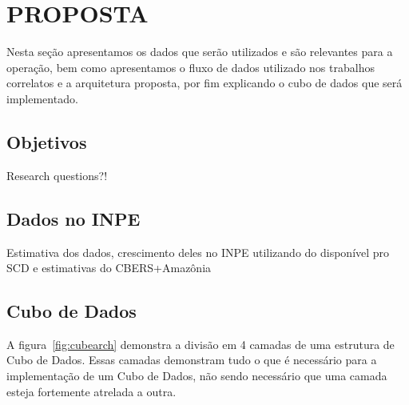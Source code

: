 
\chapter{PROPOSTA}\label{ch:prop}

{\color{red}
Nesta seção apresentamos os dados que serão utilizados e são relevantes para a operação, bem como apresentamos o fluxo de dados utilizado nos trabalhos correlatos e a arquitetura proposta, por fim explicando o cubo de dados que será implementado.
}

\section{Objetivos}\label{ch:prop:obj}

{\color{red} Research questions?!}

\section{Dados no INPE}\label{ch:prop:data}

{\color{red} Estimativa dos dados, crescimento deles no INPE utilizando do disponível pro SCD e estimativas do CBERS+Amazônia}

\section{Cubo de Dados}\label{ch:prop:cubearch}

A figura~\ref{fig:cubearch} demonstra a divisão em 4 camadas de uma estrutura de Cubo de Dados.
Essas camadas demonstram tudo o que é necessário para a implementação de um Cubo de Dados, não sendo necessário que uma camada esteja fortemente atrelada a outra.

